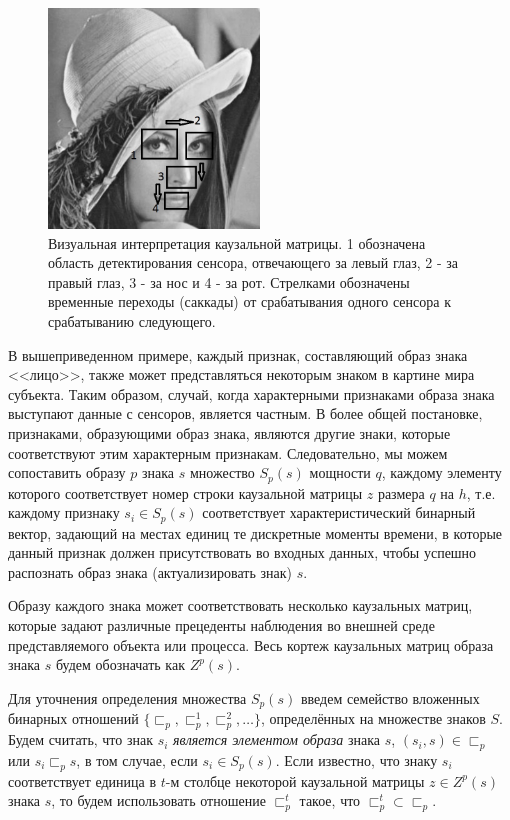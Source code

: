 \documentclass[12pt]{scrartcl}
\begin{document}
	\begin{figure}
		\label{fig:face}
		\centering
		\includegraphics[width=0.5\textwidth]{misc/photos/face}
		\caption{Визуальная интерпретация каузальной матрицы. 1 обозначена область детектирования сенсора, отвечающего за левый глаз, 2 - за правый глаз, 3 - за нос и 4 - за рот. Стрелками обозначены временные переходы (саккады) от срабатывания одного сенсора к срабатыванию следующего.}		
	\end{figure}

	В вышеприведенном примере, каждый признак, составляющий образ знака <<лицо>>, также может представляться некоторым знаком в картине мира субъекта. Таким образом, случай, когда характерными признаками образа знака выступают данные с сенсоров, является частным. В более общей постановке, признаками, образующими образ знака, являются другие знаки, которые соответствуют этим характерным признакам. Следовательно, мы можем сопоставить образу $p$ знака $s$ множество $S_p(s)$ мощности $q$, каждому элементу которого соответствует номер строки каузальной матрицы $z$ размера $q$ на $h$, т.е. каждому признаку $s_i\in S_p(s)$ соответствует характеристический бинарный вектор, задающий на местах единиц те дискретные моменты времени, в которые данный признак должен присутствовать во входных данных, чтобы успешно распознать образ знака (актуализировать знак) $s$. 
	
	Образу каждого знака может соответствовать несколько каузальных матриц, которые задают различные прецеденты наблюдения во внешней среде представляемого объекта или процесса. Весь кортеж каузальных матриц образа знака $s$ будем обозначать как $Z^p(s)$. 
		
	Для уточнения определения множества $S_p(s)$ введем семейство вложенных бинарных отношений $\{\sqsubset_p,\sqsubset_p^1,\sqsubset_p^2,\dots\}$, определённых на множестве знаков $S$. Будем считать, что знак $s_i$ \textit{является элементом образа} знака $s$, $(s_i,s)\in\sqsubset_p$ или $s_i\sqsubset_p s$, в том случае, если $s_i\in S_p(s)$. Если известно, что знаку $s_i$ соответствует единица в $t$-м столбце некоторой каузальной матрицы $z\in Z^p(s)$ знака $s$, то будем использовать отношение $\sqsubset_p^t$ такое, что  $\sqsubset_p^t\subset \sqsubset_p$.
	
\end{document}
